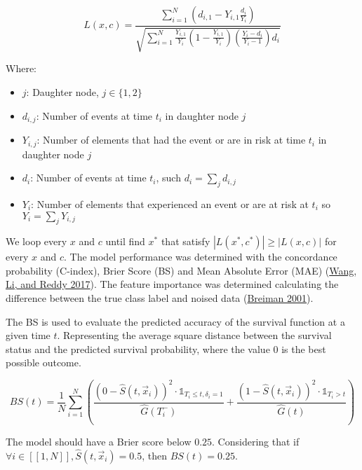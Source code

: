 \documentclass[
  12pt,
]{article}
\providecommand{\tightlist}{%
  \setlength{\itemsep}{0pt}\setlength{\parskip}{0pt}}
\begin{document}
\begin{equation}
L(x, c) = \frac{ \sum^{N}_{i=1} \left(  d_{i, 1} - Y_{i,1} \frac{d_i}{Y_i} \right)  }
               { \sqrt{  \sum^{N}_{i=1}  \frac{Y_{i,1}}{Y_i} \left( 1 - \frac{Y_{i,1}}{Y_i} \right) \left( \frac{Y_i-d_i}{Y_i-1} \right) d_i  } }
\end{equation}

Where:

\begin{itemize}
\tightlist
\item
  \(j\): Daughter node, \(j \in \{1,2\}\)
\item
  \(d_{i,j}\): Number of events at time \(t_i\) in daughter node \(j\)
\item
  \(Y_{i,j}\): Number of elements that had the event or are in risk at time \(t_i\)
  in daughter node \(j\)
\item
  \(d_i\): Number of events at time \(t_i\), such \(d_i=\sum_j{d_{i,j}}\)
\item
  \(Y_i\): Number of elements that experienced an event or are at risk at
  \(t_i\) so \(Y_i=\sum_j Y_{i,j}\)
\end{itemize}

We loop every \(x\) and \(c\) until find \(x^*\) that satisfy \(|L(x^{*}, c^{*})| \geq |L(x, c)|\)
for every \(x\) and \(c\).
The model performance was determined with the concordance probability (C-index),
Brier Score (BS) and Mean Absolute Error (MAE) (\protect\hyperlink{ref-wangmachine2017}{Wang, Li, and Reddy 2017}). The feature
importance was determined calculating the difference between the true class
label and noised data (\protect\hyperlink{ref-Breiman_2001}{Breiman 2001}).

The BS is used to evaluate the predicted accuracy of the survival function
at a given time \(t\).
Representing the average square distance between the survival status and the
predicted survival probability, where the value 0 is the best possible outcome.

\begin{equation}
BS(t) =  \frac{1}{N} \sum_{i = 1}^{N} \left( \frac{\left( 0 - \hat{S}(t, \vec{x}_i)\right)^2 \cdot \mathbb{1}_{T_i \leq t, \delta_i = 1}}{ \hat{G}(T_i^-)} + \frac{ \left( 1 - \hat{S}(t, \vec{x}_i)\right)^2 \cdot \mathbb{1}_{T_i > t}}{ \hat{G}(t)} \right)
\end{equation}

The model should have a Brier score below \(0.25\).
Considering that if \(\forall i \in [\![1, N]\!], \hat{S}(t, \vec{x}_i) = 0.5\), then \(BS(t) = 0.25\).
\end{document}
